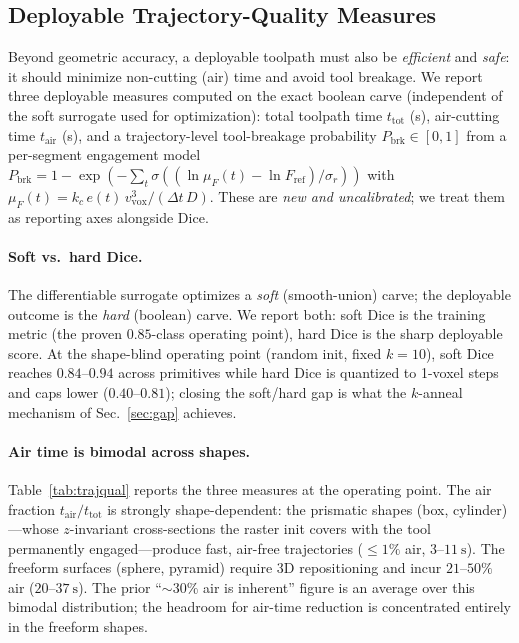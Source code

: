 \subsection{Deployable Trajectory-Quality Measures}
\label{sec:trajqual}

Beyond geometric accuracy, a deployable toolpath must also be \emph{efficient}
and \emph{safe}: it should minimize non-cutting (air) time and avoid tool
breakage. We report three deployable measures computed on the exact boolean
carve (independent of the soft surrogate used for optimization): total toolpath
time $t_{\mathrm{tot}}$ (s), air-cutting time $t_{\mathrm{air}}$ (s), and a
trajectory-level tool-breakage probability $P_{\mathrm{brk}}{\in}[0,1]$ from a
per-segment engagement model
$P_{\mathrm{brk}}{=}1{-}\exp(-\sum_t \sigma((\ln \mu_F(t) - \ln F_{\mathrm{ref}})/\sigma_r))$
with $\mu_F(t){=}k_c\, e(t)\, v_{\mathrm{vox}}^3 / (\Delta t\, D)$. These are
\emph{new and uncalibrated}; we treat them as reporting axes alongside Dice.

\paragraph{Soft vs.\ hard Dice.}
The differentiable surrogate optimizes a \emph{soft} (smooth-union) carve; the
deployable outcome is the \emph{hard} (boolean) carve. We report both: soft Dice
is the training metric (the proven $0.85$-class operating point), hard Dice is
the sharp deployable score. At the shape-blind operating point (random init,
fixed $k{=}10$), soft Dice reaches $0.84$--$0.94$ across primitives while hard
Dice is quantized to 1-voxel steps and caps lower ($0.40$--$0.81$); closing the
soft/hard gap is what the $k$-anneal mechanism of Sec.~\ref{sec:gap} achieves.

\paragraph{Air time is bimodal across shapes.}
Table~\ref{tab:trajqual} reports the three measures at the operating point.
The air fraction $t_{\mathrm{air}}/t_{\mathrm{tot}}$ is strongly shape-dependent:
the prismatic shapes (box, cylinder)---whose $z$-invariant cross-sections the
raster init covers with the tool permanently engaged---produce fast, air-free
trajectories ($\le 1\%$ air, $3$--$11~\mathrm{s}$). The freeform surfaces
(sphere, pyramid) require 3D repositioning and incur $21$--$50\%$ air
($20$--$37~\mathrm{s}$). The prior ``$\sim 30\%$ air is inherent'' figure is an
average over this bimodal distribution; the headroom for air-time reduction is
concentrated entirely in the freeform shapes.


